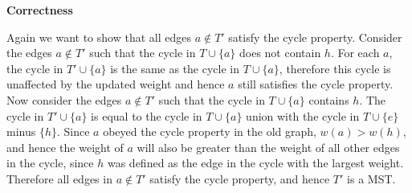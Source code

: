 \documentclass{article}
\begin{document}
\begin{solution}
\begin{enumerate}[label = (\alph*)]
    \textbf{Correctness}

    Again we want to show that all edges $a\notin T'$ satisfy the cycle property.
    Consider the edges $a\notin T'$ such that the cycle in $T\cup\{a\}$ does not contain $h$.
    For each $a$, the cycle in $T'\cup\{a\}$ is the same as the cycle in $T\cup\{a\}$,
    therefore this cycle is unaffected by the updated weight and hence $a$ still satisfies the cycle property.
    Now consider the edges $a\notin T'$ such that the cycle in $T\cup\{a\}$ contains $h$.
    The cycle in $T'\cup\{a\}$ is equal to the cycle in $T\cup\{a\}$ union with the cycle in $T\cup\{e\}$ minus $\{h\}$.
    Since $a$ obeyed the cycle property in the old graph, $w(a)>w(h)$, and hence the weight of $a$ 
    will also be greater than the weight of all other edges in the cycle, since $h$ was defined as the 
    edge in the cycle with the largest weight.
    Therefore all edges in $a\notin T'$ satisfy the cycle property, and hence $T'$ is a MST.


\end{enumerate}
\end{solution}
\end{document}

